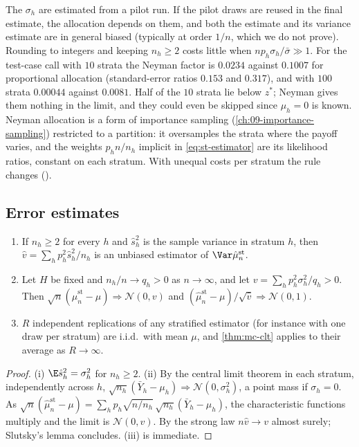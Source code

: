 The $\sigma_h$ are estimated from a pilot run. If the pilot draws are reused in the final
estimate, the allocation depends on them, and both the estimate and its variance estimate are
in general biased (typically at order $1/n$, which we do not prove). Rounding to integers and
keeping $n_h\ge2$ costs little when $np_h\sigma_h/\bar\sigma\gg1$. For the test-case call with $10$ strata the Neyman
factor is $0.0234$ against $0.1007$ for proportional allocation (standard-error ratios
$0.153$ and $0.317$), and with $100$ strata $0.00044$ against $0.0081$. Half of the
$10$ strata lie below $z^*$; Neyman gives them nothing in the limit, and they could even be
skipped since $\mu_h=0$ is known. Neyman allocation is a form of importance sampling
(\cref{ch:09-importance-sampling}) restricted to a partition: it oversamples the strata where
the payoff varies, and the weights $p_hn/n_h$ implicit in \eqref{eq:st-estimator} are its
likelihood ratios, constant on each stratum. With unequal costs per stratum the rule changes
().

\subsection{Error estimates}

\begin{proposition}\label{prop:st-error}
\begin{enumerate}[label=(\roman*)]
  \item If $n_h\ge2$ for every $h$ and $\hat s_h^2$ is the sample variance in stratum $h$,
    then $\hat v=\sum_hp_h^2\hat s_h^2/n_h$ is an unbiased estimator of
    $\Var\hat\mu^{\mathrm{st}}_n$.
  \item Let $H$ be fixed and $n_h/n\to q_h>0$ as $n\to\infty$, and let
    $v=\sum_hp_h^2\sigma_h^2/q_h>0$. Then $\sqrt n(\hat\mu^{\mathrm{st}}_n-\mu)\Rightarrow\mathcal N(0,v)$
    and $(\hat\mu^{\mathrm{st}}_n-\mu)/\sqrt{\hat v}\Rightarrow\mathcal N(0,1)$.
  \item $R$ independent replications of any stratified estimator (for instance with one draw
    per stratum) are i.i.d.\ with mean $\mu$, and \cref{thm:mc-clt} applies to their average
    as $R\to\infty$.
\end{enumerate}
\end{proposition}

\begin{proof}
(i) $\E\hat s_h^2=\sigma_h^2$ for $n_h\ge2$. (ii) By the central limit theorem in each
stratum, independently across $h$, $\sqrt{n_h}(\bar Y_h-\mu_h)\Rightarrow\mathcal N(0,\sigma_h^2)$,
a point mass if $\sigma_h=0$. As
$\sqrt n(\hat\mu^{\mathrm{st}}_n-\mu)=\sum_hp_h\sqrt{n/n_h}\,\sqrt{n_h}(\bar Y_h-\mu_h)$, the
characteristic functions multiply and the limit is $\mathcal N(0,v)$. By the strong law
$n\hat v\to v$ almost surely; Slutsky's lemma \citep[Lemma~2.8]{vandervaart-asymptotic}
concludes. (iii) is immediate.
\end{proof}

